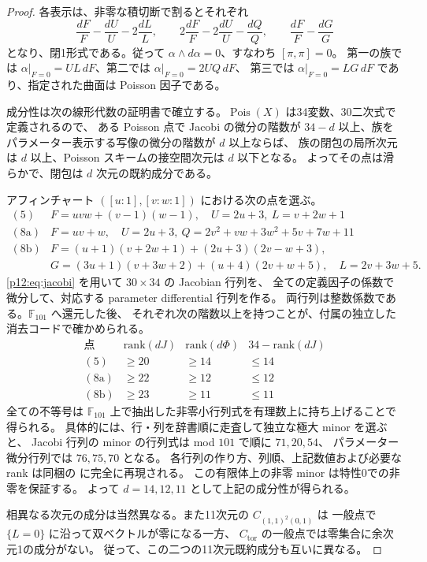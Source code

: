 \begin{proof}
各表示は、非零な積切断で割るとそれぞれ
\[
\frac{dF}{F}-\frac{dU}{U}-2\frac{dL}{L},\qquad
2\frac{dF}{F}-2\frac{dU}{U}-\frac{dQ}{Q},\qquad
\frac{dF}{F}-\frac{dG}{G}
\]
となり、閉1形式である。従って $\alpha\wedge d\alpha=0$、すなわち $[\pi,\pi]=0$。
第一の族では $\alpha|_{F=0}=UL\,dF$、第二では $\alpha|_{F=0}=2UQ\,dF$、
第三では $\alpha|_{F=0}=LG\,dF$ であり、指定された曲面は Poisson 因子である。

成分性は次の線形代数の証明書で確立する。$\operatorname{Pois}(X)$ は34変数、30二次式で定義されるので、
ある Poisson 点で Jacobi の微分の階数が $34-d$ 以上、族をパラメーター表示する写像の微分の階数が $d$ 以上ならば、
族の閉包の局所次元は $d$ 以上、Poisson スキームの接空間次元は $d$ 以下となる。
よってその点は滑らかで、閉包は $d$ 次元の既約成分である。

アフィンチャート $([u:1],[v:w:1])$ における次の点を選ぶ。
\[
\begin{array}{c|l}
\mathrm{(5)}&F=uvw+(v-1)(w-1),\quad U=2u+3,\ L=v+2w+1\\
\mathrm{(8a)}&F=uv+w,\quad U=2u+3,\ Q=2v^2+vw+3w^2+5v+7w+11\\
\mathrm{(8b)}&F=(u+1)(v+2w+1)+(2u+3)(2v-w+3),\\
&G=(3u+1)(v+3w+2)+(u+4)(2v+w+5),\quad L=2v+3w+5.
\end{array}
\]
\eqref{p12:eq:jacobi} を用いて $30\times34$ の Jacobian 行列を、
全ての定義因子の係数で微分して、対応する parameter differential 行列を作る。
両行列は整数係数である。$\mathbb F_{101}$ へ還元した後、
それぞれ次の階数以上を持つことが、付属の独立した消去コードで確かめられる。
\[
\begin{array}{c|r|r|r}
\text{点}&\mathrm{rank}(dJ)&\mathrm{rank}(d\Phi)&34-\mathrm{rank}(dJ)\\\hline
\mathrm{(5)}&\ge20&\ge14&\le14\\
\mathrm{(8a)}&\ge22&\ge12&\le12\\
\mathrm{(8b)}&\ge23&\ge11&\le11
\end{array}
\]
全ての不等号は $\mathbb F_{101}$ 上で抽出した非零小行列式を有理数上に持ち上げることで得られる。
具体的には、行・列を辞書順に走査して独立な極大 minor を選ぶと、
Jacobi 行列の minor の行列式は mod $101$ で順に $71,20,54$、
パラメーター微分行列では $76,75,70$ となる。
各行列の作り方、列順、上記数値および必要な rank は同梱の
 に完全に再現される。
この有限体上の非零 minor は特性0での非零を保証する。
よって $d=14,12,11$ として上記の成分性が得られる。

相異なる次元の成分は当然異なる。また11次元の $C_{(1,1)^2(0,1)}$ は
一般点で $\{L=0\}$ に沿って双ベクトルが零になる一方、
$C_{\mathrm{tor}}$ の一般点では零集合に余次元1の成分がない。
従って、この二つの11次元既約成分も互いに異なる。
\end{proof}

